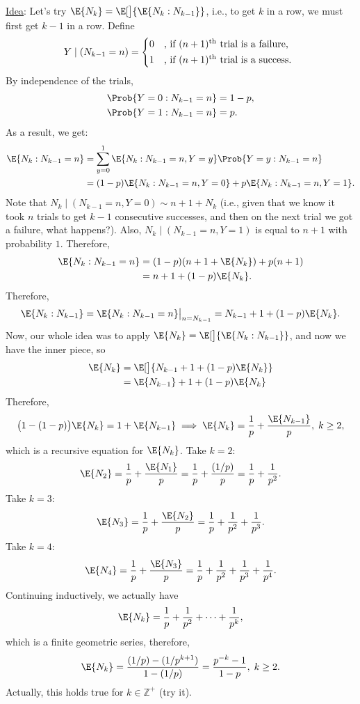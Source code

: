 \begin{Example}
    \underline{Idea}: Let's try $ \E{N_k}=\E[\big]{\E{N_k\given N_{k-1}}} $, i.e., to get $ k $ in a row,
    we must first get $ k-1 $ in a row. Define
    \[ Y\mid(N_{k-1}=n)=\begin{cases*}
            0 & , if $ (n+1)\textsuperscript{th} $ trial is a failure, \\
            1 & , if $ (n+1)\textsuperscript{th} $ trial is a success.
        \end{cases*} \]
    By independence of the trials,
    \begin{align*}
        \Prob{Y=0\given N_{k-1}=n} & =1-p, \\
        \Prob{Y=1\given N_{k-1}=n} & =p.
    \end{align*}
    As a result, we get:
    \begin{align*}
        \E{N_k\given N_{k-1}=n}
         & =\sum_{y=0}^1 \E{N_k\given N_{k-1}=n,Y=y}\Prob{Y=y\given N_{k-1}=n} \\
         & =(1-p)\E{N_k\given N_{k-1}=n,Y=0} + p\E{N_k\given N_{k-1}=n,Y=1}.
    \end{align*}
    Note that $ N_k\mid (N_{k-1}=n,Y=0) \sim n+1+N_k $ (i.e., given that we know it took $ n $ trials to get
    $ k-1 $ consecutive successes, and then on the next trial we got a failure, what happens?). Also,
    $ N_k\mid(N_{k-1}=n,Y=1) $ is equal to $ n+1 $ with probability $ 1 $. Therefore,
    \begin{align*}
        \E{N_k\given N_{k-1}=n}
         & =(1-p)(n+1+\E{N_k})+p(n+1) \\
         & =n+1+(1-p)\E{N_k}.
    \end{align*}
    Therefore, \[ \E{N_k\given N_{k-1}}=\E{N_k\given N_{k-1}=n}\big\rvert_{n=N_{k-1}}=N_{k-1}+1+(1-p)\E{N_k}. \]
    Now, our whole idea was to apply $ \E{N_k}=\E[\big]{\E{N_k\given N_{k-1}}} $, and now we have the inner piece, so
    \begin{align*}
        \E{N_k}
         & =\E[\big]{N_{k-1}+1+(1-p)\E{N_k}} \\
         & =\E{N_{k-1}}+1+(1-p)\E{N_k}
    \end{align*}
    Therefore,
    \[ \bigl(1-(1-p)\bigr)\E{N_k}=1+\E{N_{k-1}}\implies\E{N_k}=\frac{1}{p} +\frac{\E{N_{k-1}}}{p},\;k\ge 2, \]
    which is a recursive equation for $ \E{N_k} $. Take $ k=2 $:
    \[ \E{N_2}=\frac{1}{p} +\frac{\E{N_1}}{p}=\frac{1}{p} +\frac{(1/p)}{p}=\frac{1}{p} +\frac{1}{p^2}.  \]
    Take $ k=3 $:
    \[ \E{N_3}=\frac{1}{p} +\frac{\E{N_2}}{p}=\frac{1}{p}+\frac{1}{p^2} +\frac{1}{p^3}. \]
    Take $ k=4 $:
    \[ \E{N_4}=\frac{1}{p}+\frac{\E{N_3}}{p}=\frac{1}{p}+\frac{1}{p^2} +\frac{1}{p^3}+\frac{1}{p^4}. \]
    Continuing inductively, we actually have
    \[ \E{N_k}=\frac{1}{p} +\frac{1}{p^2}+\cdots+\frac{1}{p^k}, \]
    which is a finite geometric series, therefore,
    \[ \E{N_k}=\frac{(1/p)-(1/p^{k+1})}{1-(1/p)}=\frac{p^{-k}-1}{1-p},\;k\ge 2. \]
    Actually, this holds true for $ k\in\mathbb{Z}^+ $ (try it).
\end{Example}
